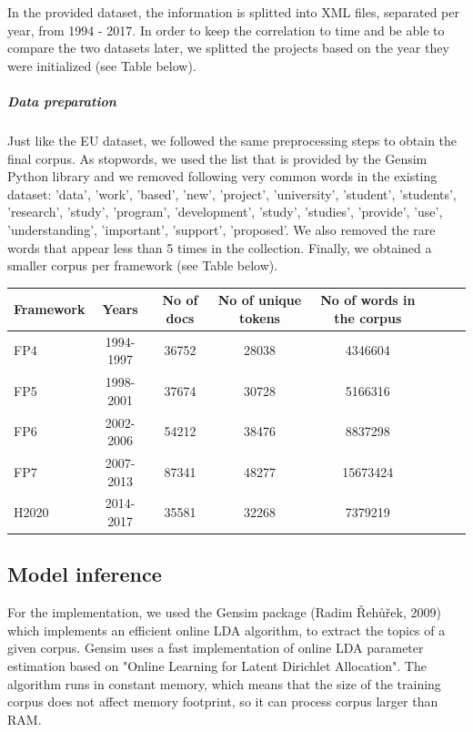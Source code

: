 \documentclass[12pt]{report}
\begin{document}
In the provided dataset, the information is splitted into XML files, separated
per year, from 1994 - 2017. In order to keep the correlation to time and be able
to compare the two datasets later, we splitted the projects based on the year
they were initialized (see Table below).


\subparagraph{Data preparation}

Just like the EU dataset, we followed the same preprocessing steps to obtain the
final corpus. As stopwords, we used the list that is provided by the Gensim
Python library and we removed following very common words in the existing
dataset: 'data', 'work', 'based', 'new', 'project', 'university', 'student',
'students', 'research', 'study', 'program', 'development', 'study', 'studies',
'provide', 'use', 'understanding', 'important', 'support', 'proposed'. We also
removed the rare words that appear less than 5 times in the collection. Finally,
we obtained a smaller corpus per framework (see Table below).

\begin{center}
\begin{tabular}{l*{6}{c}r}
Framework& Years & No of docs & No of unique tokens & No of words in the corpus \\
\hline
FP4 & 1994-1997 & 36752 & 28038 & 4346604 \\
FP5 & 1998-2001 & 37674 & 30728 & 5166316 \\
FP6 & 2002-2006 & 54212 & 38476 & 8837298 \\
FP7 & 2007-2013 & 87341 & 48277 & 15673424 \\
H2020 & 2014-2017 & 35581 & 32268 & 7379219 \\
\end{tabular}
\end{center}

\subsection{Model inference}

For the implementation, we used the Gensim package (Radim Řehůřek,
2009)\cite{rehurek_lrec} which implements an efficient online LDA algorithm, to
extract the topics of a given corpus. Gensim uses a fast implementation of
online LDA parameter estimation based on "Online Learning for Latent Dirichlet
Allocation".\cite{onlineLDAvb} The algorithm runs in constant memory, which
means that the size of the training corpus does not affect memory footprint, so
it can process corpus larger than RAM.
\end{document}
